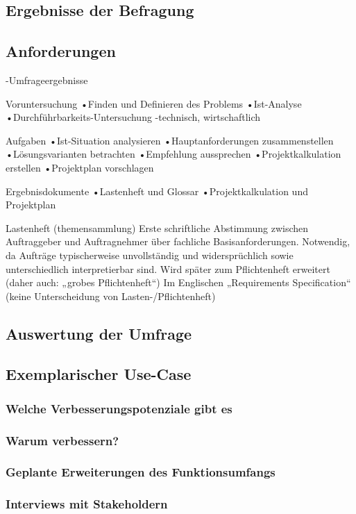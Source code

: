 \subsection{Ergebnisse der Befragung}

\subsection{Anforderungen}
-Umfrageergebnisse

Voruntersuchung
•Finden und Definieren des Problems
•Ist-Analyse
•Durchführbarkeits-Untersuchung
-technisch, wirtschaftlich

Aufgaben
•Ist-Situation analysieren
•Hauptanforderungen zusammenstellen
•Lösungsvarianten betrachten
•Empfehlung aussprechen
•Projektkalkulation erstellen
•Projektplan vorschlagen

Ergebnisdokumente
•Lastenheft und Glossar
•Projektkalkulation und Projektplan

Lastenheft (themensammlung)
Erste schriftliche Abstimmung zwischen Auftraggeber und Auftragnehmer über fachliche Basisanforderungen.
Notwendig, da Aufträge typischerweise unvollständig und widersprüchlich sowie unterschiedlich interpretierbar sind.
Wird später zum Pflichtenheft erweitert (daher auch: „grobes Pflichtenheft“)
Im Englischen „Requirements Specification“ (keine Unterscheidung von Lasten-/Pflichtenheft)

\subsection{Auswertung der Umfrage}

\subsection{Exemplarischer Use-Case}

\subsubsection{Welche Verbesserungspotenziale gibt es}

\subsubsection{Warum verbessern?}

\subsubsection{Geplante Erweiterungen des Funktionsumfangs}

\subsubsection{Interviews mit Stakeholdern}